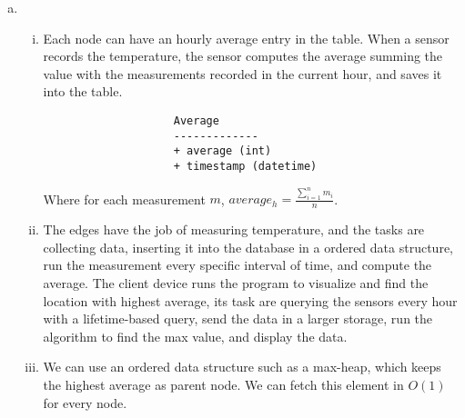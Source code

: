 \documentclass[a4paper, 12pt]{article}
\begin{document}
\begin{exercise}
	\begin{enumerate}[(a)]
    \item 
		\begin{enumerate}[i.]
			\item Each node can have an hourly average entry in the table. When
				a sensor records the temperature, the sensor computes the average
				summing the value with the measurements recorded in the current
				hour, and saves it into the table.
				\begin{verbatim}
				    Average
					-------------
					+ average (int)
					+ timestamp (datetime)
				\end{verbatim}
				Where for each measurement $m$, $average_{h} = 
		      \frac{\sum_{i=1}^{n} m_{i}} {n} $. 
			\item The edges have the job of measuring temperature, and the tasks
				are  collecting data, inserting it into
				the database in a ordered data structure, run the
				measurement every specific
				interval of time, and compute the average. The client device runs
				the program to visualize and
				find the location with highest average, its task are querying the sensors every hour
				with a lifetime-based query, send the data in a larger storage,
				run the algorithm to find the max value, and display the data.
		    \item We can use an ordered  data structure such as a max-heap,
				which keeps the highest average as parent node. We can fetch 
				this element in $O(1)$ for every node.
 

\end{enumerate}
\end{enumerate}
\end{exercise}
\end{document}
